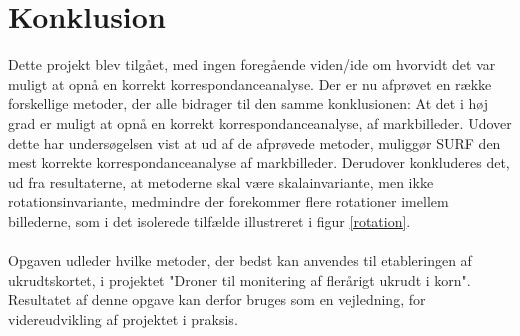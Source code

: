 \chapter{Konklusion}
Dette projekt blev tilgået, med ingen foregående viden/ide om hvorvidt det var muligt at opnå en korrekt korrespondanceanalyse. Der er nu afprøvet en række forskellige metoder, der alle bidrager til den samme konklusionen: At det i høj grad er muligt at opnå en korrekt korrespondanceanalyse, af markbilleder. Udover dette har undersøgelsen vist at ud af de afprøvede metoder, muliggør SURF den mest korrekte korrespondanceanalyse af markbilleder. 
Derudover konkluderes det, ud fra resultaterne, at metoderne skal være skalainvariante, men ikke rotationsinvariante, medmindre der forekommer flere rotationer imellem billederne, som i det isolerede tilfælde illustreret i figur \ref{rotation}.  \\ \\
Opgaven udleder hvilke metoder, der bedst kan anvendes til etableringen af ukrudtskortet, i projektet "Droner til monitering af flerårigt ukrudt i korn". Resultatet af denne opgave kan derfor bruges som en vejledning, for videreudvikling af projektet i praksis. 





